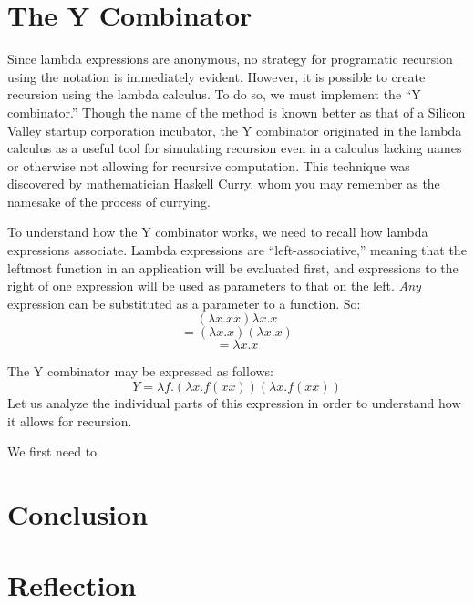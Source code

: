 \documentclass[twocolumn,titlepage]{article}
\begin{document}
\section{The Y Combinator}
Since lambda expressions are anonymous, no strategy for programatic recursion using the notation is immediately evident. However, it is possible to create recursion using the lambda calculus. To do so, we must implement the ``Y combinator.''\cite{ycombmedium} Though the name of the method is known better as that of a Silicon Valley startup corporation incubator, the Y combinator originated in the lambda calculus as a useful tool for simulating recursion even in a calculus lacking names or otherwise not allowing for recursive computation. This technique was discovered by mathematician Haskell Curry, whom you may remember as the namesake of the process of currying.

To understand how the Y combinator works, we need to recall how lambda expressions associate. Lambda expressions are ``left-associative,'' meaning that the leftmost function in an application will be evaluated first, and expressions to the right of one expression will be used as parameters to that on the left. \textit{Any} expression can be substituted as a parameter to a function. So:
$$(\lambda x.xx)\lambda x.x$$
$$=(\lambda x.x)(\lambda x.x)$$
$$=\lambda x.x$$

The Y combinator may be expressed as follows:
$$Y=\lambda f.(\lambda x.f(x x))(\lambda x.f(x x))$$
Let us analyze the individual parts of this expression in order to understand how it allows for recursion.

We first need to

\section{Conclusion}

\section{Reflection}


\end{document}
